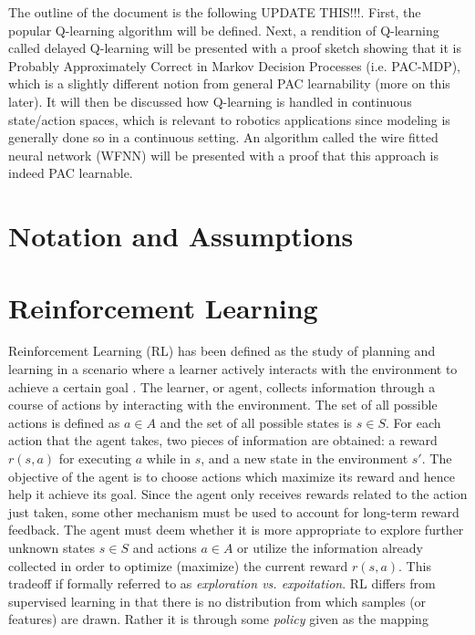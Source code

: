 \documentclass{article} %
\begin{document}
The outline of the document is the following UPDATE THIS!!!. First, the popular Q-learning algorithm will be  defined. Next, a rendition of Q-learning called delayed Q-learning will be presented with a proof sketch showing that it is Probably Approximately Correct in Markov Decision Processes (i.e. PAC-MDP), which is a slightly different notion from general PAC learnability (more on this later). It will then be discussed how Q-learning is handled in continuous state/action spaces, which is relevant to robotics applications since modeling is generally done so in a continuous setting. An algorithm called the wire fitted neural network (WFNN) will be presented with a proof that this approach is indeed PAC learnable. 

\section{Notation and Assumptions}







\section{Reinforcement Learning}

Reinforcement Learning (RL) has been defined as the study of planning and learning in a scenario where a learner actively interacts with the environment to achieve a certain goal \cite{mohri}. The learner, or agent, collects information through a course of actions by interacting with the environment.  The set of all possible actions is defined as $a \in A$ and the set of all possible states is $s \in S$. For each action that the agent takes, two pieces of information are obtained: a reward $r(s,a)$ for executing $a$ while in $s$, and a new state in the environment $s'$.  The objective of the agent is to choose actions which maximize its reward and hence help it achieve its goal.  Since the agent only receives rewards related to the action just taken, some other mechanism must be used to account for long-term reward feedback.
The agent must deem whether it is more appropriate to explore further unknown states $s \in S$ and actions $a \in A$ or utilize the information already collected in order to optimize (maximize) the current reward $r(s,a)$. This tradeoff if formally referred to as \textit{exploration vs. expoitation}. RL differs from supervised learning in that there is no distribution from which samples (or features) are drawn. Rather it is through some \textit{policy} given as the mapping
\end{document}
